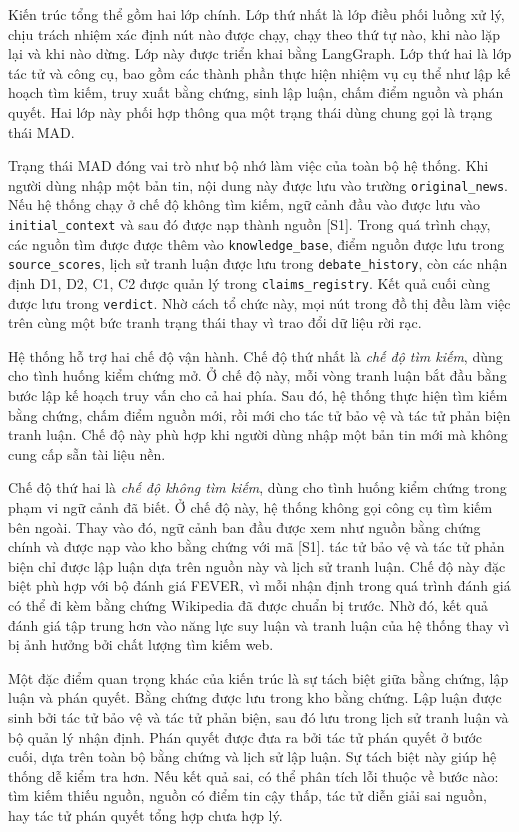 ﻿\documentclass[oneside,a4paper,12pt]{extreport}
\begin{document}
Kiến trúc tổng thể gồm hai lớp chính. Lớp thứ nhất là lớp điều phối luồng xử lý, chịu trách nhiệm xác định nút nào được chạy, chạy theo thứ tự nào, khi nào lặp lại và khi nào dừng. Lớp này được triển khai bằng LangGraph. Lớp thứ hai là lớp tác tử và công cụ, bao gồm các thành phần thực hiện nhiệm vụ cụ thể như lập kế hoạch tìm kiếm, truy xuất bằng chứng, sinh lập luận, chấm điểm nguồn và phán quyết. Hai lớp này phối hợp thông qua một trạng thái dùng chung gọi là trạng thái MAD.

Trạng thái MAD đóng vai trò như bộ nhớ làm việc của toàn bộ hệ thống. Khi người dùng nhập một bản tin, nội dung này được lưu vào trường \texttt{original\_news}. Nếu hệ thống chạy ở chế độ không tìm kiếm, ngữ cảnh đầu vào được lưu vào \texttt{initial\_context} và sau đó được nạp thành nguồn [S1]. Trong quá trình chạy, các nguồn tìm được được thêm vào \texttt{knowledge\_base}, điểm nguồn được lưu trong \texttt{source\_scores}, lịch sử tranh luận được lưu trong \texttt{debate\_history}, còn các nhận định D1, D2, C1, C2 được quản lý trong \texttt{claims\_registry}. Kết quả cuối cùng được lưu trong \texttt{verdict}. Nhờ cách tổ chức này, mọi nút trong đồ thị đều làm việc trên cùng một bức tranh trạng thái thay vì trao đổi dữ liệu rời rạc.

Hệ thống hỗ trợ hai chế độ vận hành. Chế độ thứ nhất là \textit{chế độ tìm kiếm}, dùng cho tình huống kiểm chứng mở. Ở chế độ này, mỗi vòng tranh luận bắt đầu bằng bước lập kế hoạch truy vấn cho cả hai phía. Sau đó, hệ thống thực hiện tìm kiếm bằng chứng, chấm điểm nguồn mới, rồi mới cho tác tử bảo vệ và tác tử phản biện tranh luận. Chế độ này phù hợp khi người dùng nhập một bản tin mới mà không cung cấp sẵn tài liệu nền.

Chế độ thứ hai là \textit{chế độ không tìm kiếm}, dùng cho tình huống kiểm chứng trong phạm vi ngữ cảnh đã biết. Ở chế độ này, hệ thống không gọi công cụ tìm kiếm bên ngoài. Thay vào đó, ngữ cảnh ban đầu được xem như nguồn bằng chứng chính và được nạp vào kho bằng chứng với mã [S1]. tác tử bảo vệ và tác tử phản biện chỉ được lập luận dựa trên nguồn này và lịch sử tranh luận. Chế độ này đặc biệt phù hợp với bộ đánh giá FEVER, vì mỗi nhận định trong quá trình đánh giá có thể đi kèm bằng chứng Wikipedia đã được chuẩn bị trước. Nhờ đó, kết quả đánh giá tập trung hơn vào năng lực suy luận và tranh luận của hệ thống thay vì bị ảnh hưởng bởi chất lượng tìm kiếm web.

Một đặc điểm quan trọng khác của kiến trúc là sự tách biệt giữa bằng chứng, lập luận và phán quyết. Bằng chứng được lưu trong kho bằng chứng. Lập luận được sinh bởi tác tử bảo vệ và tác tử phản biện, sau đó lưu trong lịch sử tranh luận và bộ quản lý nhận định. Phán quyết được đưa ra bởi tác tử phán quyết ở bước cuối, dựa trên toàn bộ bằng chứng và lịch sử lập luận. Sự tách biệt này giúp hệ thống dễ kiểm tra hơn. Nếu kết quả sai, có thể phân tích lỗi thuộc về bước nào: tìm kiếm thiếu nguồn, nguồn có điểm tin cậy thấp, tác tử diễn giải sai nguồn, hay tác tử phán quyết tổng hợp chưa hợp lý.
\end{document}
